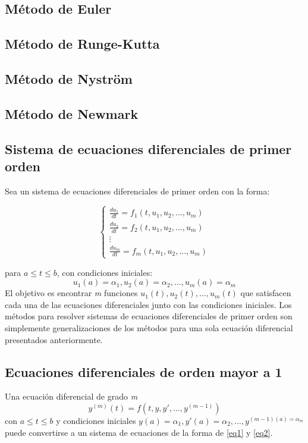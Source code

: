 \documentclass[titlepage,a4paper]{article}
\begin{document}
	\subsection{Método de Euler}
	\subsection{Método de Runge-Kutta}
	\subsection{Método de Nystr\"om}
	\subsection{Método de Newmark}

	\subsection{Sistema de ecuaciones diferenciales de primer orden}\cite{burden_system_diff_eq}
		Sea un sistema de ecuaciones diferenciales de primer orden con la forma:

		\begin{equation}
			\label{eq1}
			\begin{cases}
				\frac{du_{1}}{dt}=f_{1}(t,u_{1},u_{2},...,u_{m})\\
				\frac{du_{2}}{dt}=f_{2}(t,u_{1},u_{2},...,u_{m})\\
				\vdots\\
				\frac{du_{m}}{dt}=f_{m}(t,u_{1},u_{2},...,u_{m})
			\end{cases}
		\end{equation}

		para $a \leq t \leq b$, con condiciones iniciales:
		\begin{equation}
			\label{eq2}
			u_{1}(a) = \alpha_{1}, u_{2}(a)=\alpha_{2}, \dots, u_{m}(a)=\alpha_{m}
		\end{equation}
		El objetivo es encontrar \emph{m} funciones $u_{1}(t),u_{2}(t),\dots,u_{m}(t)$ que satisfacen 
		cada una de las ecuaciones diferenciales junto con las condiciones iniciales.
		Los métodos para resolver sistemas de ecuaciones diferenciales de primer orden son simplemente 
		generalizaciones de los métodos para una sola ecuación diferencial presentados anteriormente.

	\subsection{Ecuaciones diferenciales de orden mayor a 1}\cite{burden_higher_order_diff_eq}
			Una ecuación diferencial de grado \emph{m}
			\begin{equation}
				y^{(m)}(t)=f(t,y,y',\dots,y^{(m-1)})
			\end{equation}
			con $a \leq t \leq b$ y condiciones iniciales $y(a)=\alpha_{1},y'(a)=\alpha_{2},\dots,y^{(m-1)(a)=\alpha_{m}}$ 
			puede convertirse a un sistema de ecuaciones de la forma de \eqref{eq1} y \eqref{eq2}.
\end{document}
